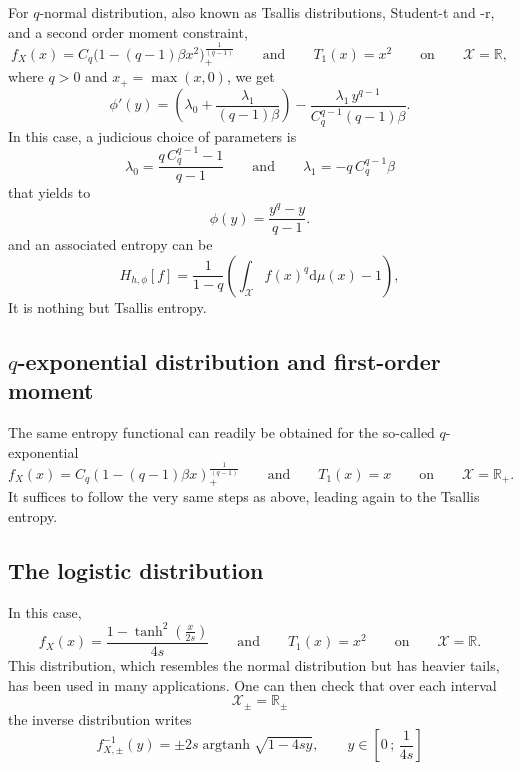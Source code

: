 \documentclass[english,onecolumn]{elsarticle}
\def\dmu{\mathrm{d}\mu}
\def\Rset{\mathbb{R}}
\def\X{\mathcal{X}}
\def\argtanh{\operatorname{argtanh}}
\begin{document}
For $q$-normal distribution, also  known as Tsallis distributions, Student-t and
-r, and a second order moment constraint,
%
\[
f_X(x) = C_q \Big( 1 - (q-1) \beta x^2 \Big)_{\!+}^{\frac{1}{(q-1)}} \qquad
\mbox{and} \qquad T_1(x) = x^2 \qquad \mbox{on} \qquad \X = \Rset,
\]
%
where $q > 0$ and $x_+ = \max(x,0)$, we get
%
\[
\phi'(y) = \left( \lambda_0 + \frac{\lambda_1}{(q-1) \beta} \right) -
\frac{\lambda_1 \, y^{q-1}}{C_q^{q-1} (q-1) \beta}.
\]
%
In this case, a judicious choice of parameters is
%
\[
\lambda_0 = \frac{q \, C_q^{q-1}-1}{q-1} \qquad \mbox{and} \qquad \lambda_1 =
- q \, C_q^{q-1} \beta
\]
%
that yields to
\[
\phi(y) = \frac{y^q-y}{q-1}.
\]
%
and an associated entropy can be 
\[
H_{h,\phi}[f]=\frac{1}{1-q}\left(\int_{\X} f(x)^q \dmu(x) - 1 \right),
\]
%
It is nothing but Tsallis entropy.



\subsection{$q$-exponential distribution and first-order moment}
\label{subsec:qExponentialFirstOrder}

The  same  entropy  functional  can   readily  be  obtained  for  the  so-called
$q$-exponential
%
\[
f_X(x) = C_q \left(1-(q-1)\beta x\right)_+^{\frac{1}{(q-1)}} \qquad \mbox{and}
\qquad T_1(x) = x \qquad \mbox{on} \qquad \X = \Rset_+.
\]
%
It suffices to follow the very same steps as above, leading again to the Tsallis
entropy.




\subsection{The logistic distribution}
\label{subsec:Logistic}

In this case,
%
\[
f_X(x) = \frac{1 - \tanh^2 \! \left( \frac{x}{2 s} \right)}{4 s} \qquad
\mbox{and} \qquad T_1(x) = x^2  \qquad \mbox{on} \qquad \X = \Rset.
\]
%
%
This  distribution, which  resembles  the normal  distribution  but has  heavier
tails, has been used in many applications. One can then check that over each interval
%
\[
\X_\pm = \Rset_\pm
\]
%
the inverse distribution writes
%
\[
f_{X,\pm}^{-1}(y) = \pm 2 s \argtanh \sqrt{1 - 4 s y}, \qquad y \in \left[ 0 \,
; \, \frac{1}{4 s} \right]
\]
\end{document}
